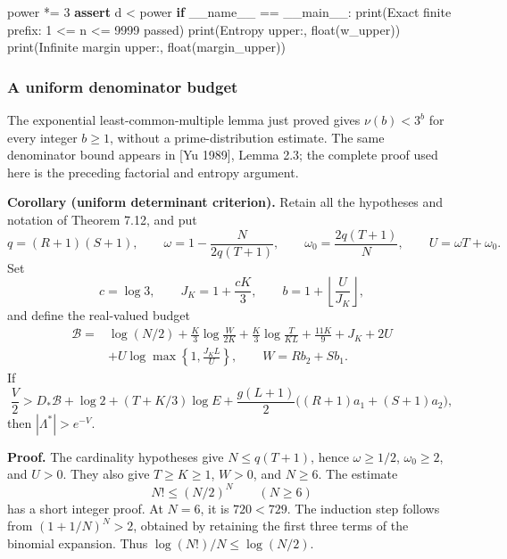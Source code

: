 \documentclass[
  11pt,
  a4paper,
]{article}
\newenvironment{Shaded}{}{}
\newcommand{\BuiltInTok}[1]{\textcolor[rgb]{0.00,0.50,0.00}{#1}}
\newcommand{\ControlFlowTok}[1]{\textcolor[rgb]{0.00,0.44,0.13}{\textbf{#1}}}
\newcommand{\DecValTok}[1]{\textcolor[rgb]{0.25,0.63,0.44}{#1}}
\newcommand{\NormalTok}[1]{#1}
\newcommand{\OperatorTok}[1]{\textcolor[rgb]{0.40,0.40,0.40}{#1}}
\newcommand{\StringTok}[1]{\textcolor[rgb]{0.25,0.44,0.63}{#1}}
\newcommand{\VariableTok}[1]{\textcolor[rgb]{0.10,0.09,0.49}{#1}}
\begin{document}
\begin{Shaded}
\begin{Highlighting}[]
\NormalTok{    power }\OperatorTok{*=} \DecValTok{3}
    \ControlFlowTok{assert}\NormalTok{ d }\OperatorTok{\textless{}}\NormalTok{ power}
\ControlFlowTok{if} \VariableTok{\_\_name\_\_} \OperatorTok{==} \StringTok{\textquotesingle{}\_\_main\_\_\textquotesingle{}}\NormalTok{:}
    \BuiltInTok{print}\NormalTok{(}\StringTok{\textquotesingle{}Exact finite prefix: 1 \textless{}= n \textless{}= 9999 passed\textquotesingle{}}\NormalTok{)}
    \BuiltInTok{print}\NormalTok{(}\StringTok{\textquotesingle{}Entropy upper:\textquotesingle{}}\NormalTok{, }\BuiltInTok{float}\NormalTok{(w\_upper))}
    \BuiltInTok{print}\NormalTok{(}\StringTok{\textquotesingle{}Infinite margin upper:\textquotesingle{}}\NormalTok{, }\BuiltInTok{float}\NormalTok{(margin\_upper))}
\end{Highlighting}
\end{Shaded}

\subsubsection{A uniform denominator
budget}\label{a-uniform-denominator-budget}

The exponential least-common-multiple lemma just proved gives
\(\nu(b)<3^b\) for every integer \(b\ge1\), without a prime-distribution
estimate. The same denominator bound appears in {[}Yu 1989{]}, Lemma
2.3; the complete proof used here is the preceding factorial and entropy
argument.

\textbf{Corollary (uniform determinant criterion).} Retain all the
hypotheses and notation of Theorem 7.12, and put \[
q=(R+1)(S+1),\qquad
\omega=1-\frac{N}{2q(T+1)},\qquad
\omega_0=\frac{2q(T+1)}N,\qquad
U=\omega T+\omega_0.
\] Set \[
c=\log3,\qquad J_K=1+\frac{cK}{3},\qquad
b=1+\left\lfloor\frac{U}{J_K}\right\rfloor,
\] and define the real-valued budget \[
\begin{aligned}
\mathcal B={}&\log(N/2)
+\frac K3\log\frac{W}{2K}
+\frac K3\log\frac{T}{KL}
+\frac{11K}{9}+J_K+2U\\
&+U\log\max\left\{1,\frac{J_KL}{U}\right\},
\qquad W=R b_2+S b_1.
\end{aligned} \tag{7.57}
\] If \[
\frac V2>D_*\mathcal B+\log2+(T+K/3)\log E
+\frac{g(L+1)}2\big((R+1)a_1+(S+1)a_2\big),
\tag{7.58}
\] then \(|\Lambda^*|>e^{-V}\).

\textbf{Proof.} The cardinality hypotheses give \(N\le q(T+1)\), hence
\(\omega\ge1/2\), \(\omega_0\ge2\), and \(U>0\). They also give
\(T\ge K\ge1\), \(W>0\), and \(N\ge6\). The estimate \[
N!\le(N/2)^N\qquad(N\ge6)
\] has a short integer proof. At \(N=6\), it is \(720<729\). The
induction step follows from \((1+1/N)^N>2\), obtained by retaining the
first three terms of the binomial expansion. Thus
\(\log(N!)/N\le\log(N/2)\).
\end{document}
